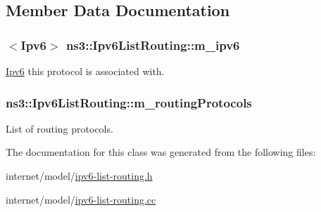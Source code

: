 \subsection{Member Data Documentation}
\subsubsection[{\texorpdfstring{m\+\_\+ipv6}{m_ipv6}}]{$<${\bf Ipv6}$>$ ns3\+::\+Ipv6\+List\+Routing\+::m\+\_\+ipv6\hspace{0.3cm}{\ttfamily [private]}}\hypertarget{classns3_1_1Ipv6ListRouting_af82ea298d92eb8cfcb6c7572e32b517d}{}\label{classns3_1_1Ipv6ListRouting_af82ea298d92eb8cfcb6c7572e32b517d}


\hyperlink{classns3_1_1Ipv6}{Ipv6} this protocol is associated with. 

\subsubsection[{\texorpdfstring{m\+\_\+routing\+Protocols}{m_routingProtocols}}]{ ns3\+::\+Ipv6\+List\+Routing\+::m\+\_\+routing\+Protocols\hspace{0.3cm}{\ttfamily [private]}}\hypertarget{classns3_1_1Ipv6ListRouting_aec46de403a1c73088ce952d7cbd804e8}{}\label{classns3_1_1Ipv6ListRouting_aec46de403a1c73088ce952d7cbd804e8}


List of routing protocols. 



The documentation for this class was generated from the following files\+:\begin{DoxyCompactItemize}
\item 
internet/model/\hyperlink{ipv6-list-routing_8h}{ipv6-\/list-\/routing.\+h}\item 
internet/model/\hyperlink{ipv6-list-routing_8cc}{ipv6-\/list-\/routing.\+cc}\end{DoxyCompactItemize}
